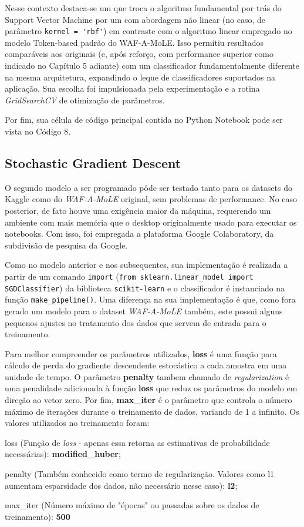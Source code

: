 Nesse contexto destaca-se um que troca o algoritmo fundamental por trás do Support Vector Machine por um com abordagem não linear (no caso, de parâmetro \verb+kernel = 'rbf'+) em contraste com o algoritmo linear empregado no modelo Token-based padrão do WAF-A-MoLE. Isso permitiu resultados comparáveis aos originais (e, após reforço, com performance superior como indicado no Capítulo 5 adiante) com um classificador fundamentalmente diferente na mesma arquitetura, expandindo o leque de classificadores suportados na aplicação. Sua escolha foi impulsionada pela experimentação e a rotina \textit{GridSearchCV} de otimização de parâmetros.

Por fim, sua célula de código principal contida no Python Notebook pode ser vista no Código 8.

\label{sec:codigos:modelos}
\bigskip

\subsection{Stochastic Gradient Descent}
O segundo modelo a ser programado pôde ser testado tanto para os datasets do Kaggle como do \textit{WAF-A-MoLE} original, sem problemas de performance. No caso posterior, de fato houve uma exigência maior da máquina, requerendo um ambiente com mais memória que o desktop originalmente usado para executar os notebooks. Com isso, foi empregada a plataforma Google Colaboratory, da subdivisão de pesquisa da Google. 

Como no modelo anterior e nos subsequentes, sua implementação é realizada a partir de um comando \verb+import+ (\verb+from sklearn.linear_model import SGDClassifier+) da biblioteca \verb+scikit-learn+ e o classificador é instanciado na função \verb+make_pipeline()+. Uma diferença na sua implementação é que, como fora gerado um modelo para o dataset \textit{WAF-A-MoLE} também, este possui alguns pequenos ajustes no tratamento dos dados que servem de entrada para o treinamento.

Para melhor compreender os parâmetros utilizados, \textbf{loss} é uma função para cálculo de perda do gradiente descendente estocástico a cada amostra em uma unidade de tempo. O parâmetro \textbf{penalty} tambem chamado de \textit{regularization} é uma penalidade adicionada à função \textbf{loss} que reduz os parâmetros do modelo em direção ao vetor zero. Por fim, \textbf{max\_iter} é o parâmetro que controla o número máximo de iterações durante o treinamento de dados, variando de 1 a infinito. Os valores utilizados no treinamento foram:
\begin{alineas}
    \item loss (Função de \textit{loss} - apenas essa retorna as estimativas de probabilidade necessárias): \textbf{modified\_huber};
    \item penalty (Também conhecido como termo de regularização. Valores como l1 aumentam esparsidade dos dados, não necessário nesse caso): \textbf{l2};
    \item max\_iter (Número máximo de "épocas" ou passadas sobre os dados de treinamento): \textbf{500}
\end{alineas}


